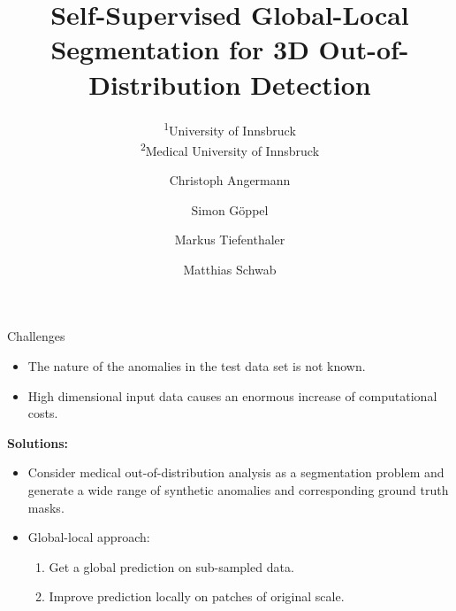 \documentclass[10pt,aspectratio=169]{beamer}
\title[]{Self-Supervised Global-Local Segmentation for 3D Out-of-Distribution Detection}
\subtitle{\textsuperscript{1}University of Innsbruck\\ \textsuperscript{2}Medical University of Innsbruck}
\author[Angermann et al.]{Christoph Angermann \inst{1} \and Simon Göppel \inst{1} \and Markus Tiefenthaler \inst{2} \and Matthias Schwab \inst{2}}
\date{}
\begin{document}







\begin{frame}{Challenges}
	\begin{itemize}
		\item The nature of the anomalies in the test data set is not known.
		\item High dimensional input data causes an enormous increase of computational costs.
	\end{itemize}
	\pause \vspace{1.5em}
	{\Large\textbf{Solutions:  }}\pause \vspace{1.5em}

	\begin{itemize}
		\item Consider medical out-of-distribution analysis as a segmentation problem  and generate a wide range of synthetic anomalies and corresponding ground truth masks. 
		\item Global-local approach: 
		\begin{enumerate}
			\item Get a global prediction on sub-sampled data.
			\item Improve prediction locally on patches of original scale.
		\end{enumerate}  

	\end{itemize}
\end{frame}
\end{document}
